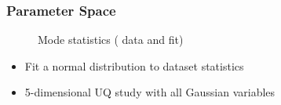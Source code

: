 \documentclass[9pt]{beamer}
\begin{document}
\begin{frame}
\frametitle{Parameter Space}
\label{sec-3-17}

\vspace*{-0.0cm}\begin{figure}
      \caption{Mode statistics ({\color{blue} data} and {\color{red} fit})}
\end{figure}
\begin{itemize}
\item Fit a normal distribution to dataset statistics
\item 5-dimensional UQ study with all Gaussian variables
\end{itemize}
\end{frame}
\end{document}
